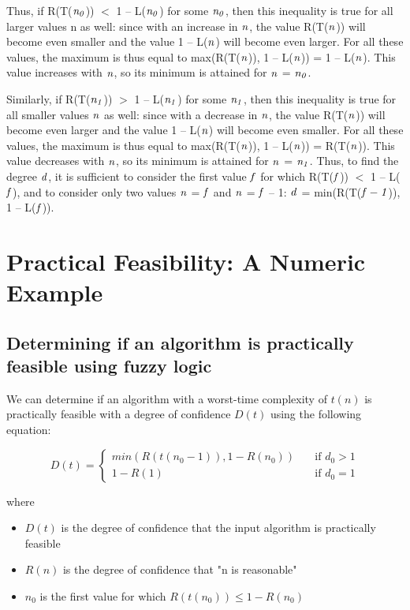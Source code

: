 \documentclass[draft]{article}
\theoremstyle{definition}
\begin{document}
Thus, if R(T($\it{n_0}$)) $<$ 1 – L($\it{n_0}$) for some $\it{n_0}$, then this inequality is true for all larger values n as well: since with an increase in $\it{n}$, the value R(T($\it{n}$)) will become even smaller and the value 1 – L($\it{n}$) will become even larger. For all these values, the maximum is thus equal to max(R(T($\it{n}$)), 1 – L($\it{n}$)) = 1 – L($\it{n}$). This value increases with $\it{n}$, so its minimum is attained for $\it{n}$ = $\it{n_0}$. 
\medskip

Similarly, if R(T($\it{n_1}$)) $>$ 1 – L($\it{n_1}$) for some $\it{n_1}$, then this inequality is true for all smaller values $\it{n}$ as well: since with a decrease in $\it{n}$, the value R(T($\it{n}$)) will become even larger and the value 1 – L($\it{n}$) will become even smaller. For all these values, the maximum is thus equal to max(R(T($\it{n}$)), 1 – L($\it{n}$)) = R(T($\it{n}$)). This value decreases with $\it{n}$, so its minimum is attained for $\it{n}$ = $\it{n_1}$. Thus, to find the degree $\it{d}$, it is sufficient to consider the first value $\it{f}$ for which R(T($\it{f}$)) $<$ 1 – L($\it{f}$), and to consider only two values $\it{n}$ = $\it{f}$ and $\it{n}$ = $\it{f}$ – 1: $\it{d}$ = min(R(T($\it{f-1}$)), 1 – L($\it{f}$)).

\section{Practical Feasibility: A Numeric Example}
\subsection{Determining if an algorithm is practically feasible using fuzzy logic}
We can determine if an algorithm with a worst-time complexity of $t(n)$ is practically feasible with a degree of confidence $D(t)$ using the following equation:

\begin{equation}
D(t)=
  \begin{cases}
    min(R(t(n_0-1)), 1-R(n_0))       & \quad \text{if } d_0>1\\
    1-R(1)  & \quad \text{if } d_0=1
  \end{cases}
\end{equation}

where
\begin{itemize}
    \item $D(t)$ is the degree of confidence that the input algorithm is practically feasible
    \item $R(n)$ is the degree of confidence that "n is reasonable"
    \item $n_0$ is the first value for which $R(t(n_0)) \leq 1 - R(n_0)$
\end{itemize}
\end{document}
